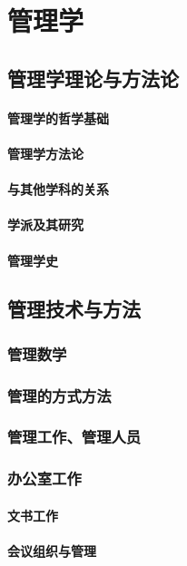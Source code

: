 \documentclass[UTF8]{../RepresentationUniverse}
\begin{document}
\chapter{管理学}
\section{管理学理论与方法论}
    \subsubsection{管理学的哲学基础}
    \subsubsection{管理学方法论}
    \subsubsection{与其他学科的关系}
    \subsubsection{学派及其研究}
    \subsubsection{管理学史}
\section{管理技术与方法}
    \subsection{管理数学}
    \subsection{管理的方式方法}
    \subsection{管理工作、管理人员}
    \subsection{办公室工作}
        \subsubsection{文书工作}
        \subsubsection{会议组织与管理}
\end{document}

